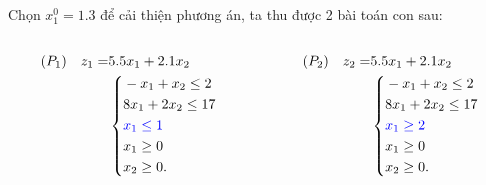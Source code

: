 \documentclass{beamer}
\begin{document}
\begin{frame}
Chọn $x^0_1=1.3$ để cải thiện phương án, ta thu được 2 bài toán con sau:
\begin{columns}
\begin{column}{0.5\textwidth}
    \begin{equation*}
        \begin{split}
            (P_1) \quad z_1= & 5.5x_1 + 2.1x_2 \\
            & \left\{\begin{split}
            & -x_1 + x_2 \leq 2 \\
            & 8x_1 + 2x_2 \leq 17 \\
            & \color{blue} x_1 \leq 1 \\
            &x_1 \geq 0 \\
            &x_2 \geq 0. \\
            \end{split}\right. \\
        \end{split}
    \end{equation*}
\end{column}
\begin{column}{0.5\textwidth}
   \begin{equation*}
        \begin{split}
            (P_2) \quad z_2= & 5.5x_1 + 2.1x_2  \\
            & \left\{\begin{split}
            & -x_1 + x_2 \leq 2 \\
            & 8x_1 + 2x_2 \leq 17 \\
            & \color{blue} x_1 \geq 2 \\
            &x_1 \geq 0 \\
            &x_2 \geq 0. \\
            \end{split}\right. \\
        \end{split}
    \end{equation*}
\end{column}
\end{columns}
\end{frame}
\end{document}

